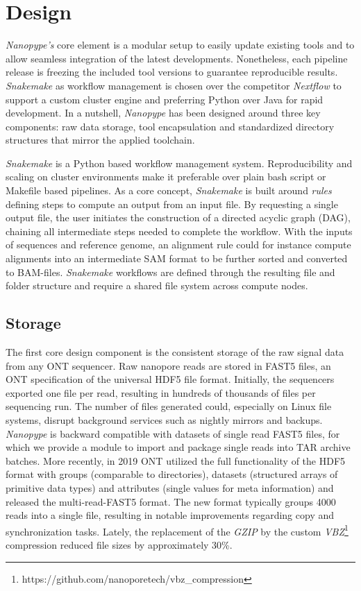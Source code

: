 \section{Design}
\label{sec:nanopype:design}
\textit{Nanopype’s} core element is a modular setup to easily update existing tools and to allow seamless integration of the latest developments. Nonetheless, each pipeline release is freezing the included tool versions to guarantee reproducible results. \textit{Snakemake} as workflow management is chosen over the competitor \textit{Nextflow} to support a custom cluster engine and preferring Python over Java for rapid development. In a nutshell, \textit{Nanopype} has been designed around three key components: raw data storage, tool encapsulation and standardized directory structures that mirror the applied toolchain.

\begin{tcolorbox}[breakable,title=Snakemake]
	\textit{Snakemake} is a Python based workflow management system. Reproducibility and scaling on cluster environments make it preferable over plain bash script or Makefile based pipelines. As a core concept, \textit{Snakemake} is built around \textit{rules} defining steps to compute an output from an input file. By requesting a single output file, the user initiates the construction of a directed acyclic graph (DAG), chaining all intermediate steps needed to complete the workflow. With the inputs of sequences and reference genome, an alignment rule could for instance compute alignments into an intermediate SAM format to be further sorted and converted to BAM-files. \textit{Snakemake} workflows are defined through the resulting file and folder structure and require a shared file system across compute nodes.
\end{tcolorbox}


\subsection{Storage}
\label{subsec:nanopype:storage}
The first core design component is the consistent storage of the raw signal data from any ONT sequencer. 
Raw nanopore reads are stored in FAST5 files, an ONT specification of the universal HDF5 file format. Initially, the sequencers exported one file per read, resulting in hundreds of thousands of files per sequencing run. 
The number of files generated could, especially on Linux file systems, disrupt background services such as nightly mirrors and backups.
\textit{Nanopype} is backward compatible with datasets of single read FAST5 files, for which we provide a module to import and package single reads into TAR archive batches. More recently, in 2019 ONT utilized the full functionality of the HDF5 format with groups (comparable to directories), datasets (structured arrays of primitive data types) and attributes (single values for meta information) and released the multi-read-FAST5 format. The new format typically groups 4000 reads into a single file, resulting in notable improvements regarding copy and synchronization tasks. Lately, the replacement of the \textit{GZIP} by the custom \textit{VBZ}\footnote{https://github.com/nanoporetech/vbz\_compression} compression reduced file sizes by approximately 30\%.

